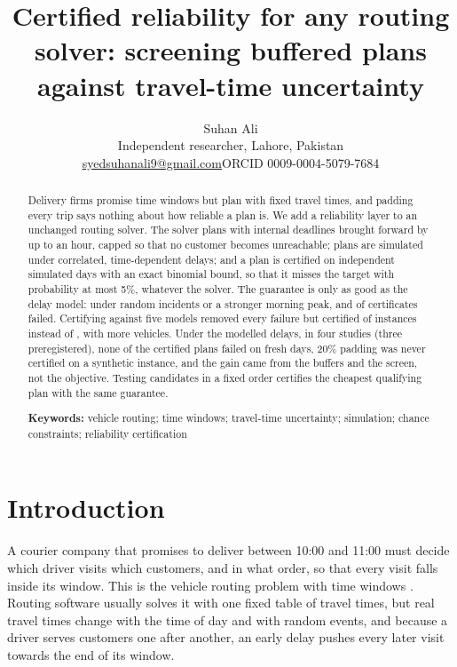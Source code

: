 \documentclass[11pt,a4paper]{article}
\title{Certified reliability for any routing solver: screening buffered plans
against travel-time uncertainty}
\author{Suhan Ali\\[2pt]
\small Independent researcher, Lahore, Pakistan\\
\small \href{mailto:syedsuhanali9@gmail.com}{syedsuhanali9@gmail.com}\quad ORCID 0009-0004-5079-7684}
\date{}
\theoremstyle{remark}
\begin{document}
\maketitle
\onehalfspacing

\begin{abstract}
\noindent Delivery firms promise time windows but plan with fixed travel times, and
padding every trip says nothing about how reliable a plan is. We add a reliability
layer to an unchanged routing solver. The solver plans
with internal deadlines brought forward by up to an hour, capped so that no customer
becomes unreachable; plans are simulated under correlated, time-dependent delays; and
a plan is certified on independent simulated days with an exact binomial bound, so
that it misses the target with probability at most 5\%, whatever the solver. The
guarantee is only as good as the delay model: under random incidents or a stronger
morning peak, \WrIncFailed{} and \WrPeakFailed{} of \WrIncCert{} certificates failed.
Certifying against five models removed every failure but certified \StOStress{} of
\StOInst{} instances instead of \StOSingle{}, with \StOFleet{} more vehicles. Under the
modelled delays, in four studies (three preregistered), none of the \CertTotal{}
certified plans failed on fresh days, 20\% padding was never certified on a synthetic
instance, and the gain came from the buffers and the screen, not the objective.
Testing candidates in a fixed order certifies the cheapest qualifying plan with the
same guarantee.

\medskip\noindent\textbf{Keywords:} vehicle routing; time windows; travel-time
uncertainty; simulation; chance constraints; reliability certification
\end{abstract}

\section{Introduction}

A courier company that promises to deliver between 10:00 and 11:00 must decide
which driver visits which customers, and in what order, so that every visit falls
inside its window. This is the vehicle routing problem with time windows
\citep[VRPTW;][]{solomon1987,toth2014}. Routing software usually solves it with one
fixed table of travel times, but real travel times change with the time of day and
with random events, and because a driver serves customers one after another, an
early delay pushes every later visit towards the end of its window.
\end{document}
